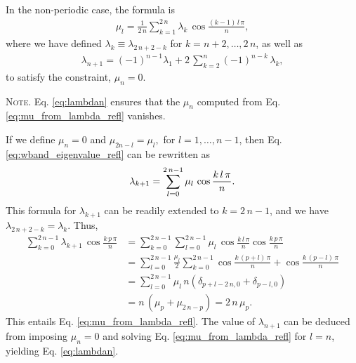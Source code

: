 \documentclass[reprint, superscriptaddress, floatfix]{revtex4-1}
\newcommand{\note}[1]{{\color{DarkGreen}\footnotesize \textsc{Note.} #1}}
\begin{document}
In the non-periodic case,
the formula is
%
\begin{align}
  \mu_l
  =
  \frac 1 { 2 \, n }
  \sum_{ k = 1 }^{ 2 \, n }
    \lambda_{ k } \,
    \cos \frac{ (k - 1) \, l \, \pi }
              {            n        }
  ,
\label{eq:mu_from_lambda_refl}
\end{align}
%
where
we have defined
$\lambda_k \equiv \lambda_{2 \, n + 2 - k}$
for $k = n + 2, \dots, 2 \, n$,
as well as
%
\begin{align}
  \lambda_{ n + 1 }
  =
  (-1)^{ n - 1 }
  \lambda_1
  +
  2 \, \sum_{ k = 2 }^{ n }
      (-1)^{n - k} \, \lambda_k
  ,
\label{eq:lambdan}
\end{align}
to satisfy the constraint, $\mu_n = 0$.
%
\note{Eq. \eqref{eq:lambdan}
  ensures that the $\mu_n$
  computed from Eq. \eqref{eq:mu_from_lambda_refl}
  vanishes.

  If we define $\mu_n = 0$ and
  $
    \mu_{ 2 n - l } = \mu_l,
  $
  for
  $l = 1, \dots, n - 1$,
  then Eq. \eqref{eq:wband_eigenvalue_refl} can be rewritten as
  \begin{align}
    \lambda_{k+1}
    =
    \sum_{ l = 0 }^{ 2 \, n - 1 }
    \mu_l \, \cos \frac{ k \, l \, \pi } { n }.
  \notag
  \end{align}
  This formula for $\lambda_{k+1}$
  can be readily extended to $k = 2 \, n - 1$,
  and we have
  $
    \lambda_{ 2 \, n + 2 - k } = \lambda_k
    .
  $
  Thus,
  $$
  \begin{aligned}
    \sum_{ k = 0 }^{ 2 \, n - 1 }
      \lambda_{ k + 1 } \,
      \cos \frac{ k \, p \, \pi }
                {      n        }
    &=
    \sum_{ k = 0 }^{ 2 \, n - 1 }
      \sum_{ l = 0 }^{ 2 \, n - 1 }
        \mu_l \,
        \cos \frac{ k \, l \, \pi }
                  {      n        }
        \cos \frac{ k \, p \, \pi }
                  {      n        }
    \\
    &=
    \sum_{ l = 0 }^{ 2 \, n - 1 }
      \frac{ \mu_l } { 2 }
      \sum_{ k = 0 }^{ 2 \, n - 1 }
        \cos \frac{ k \, (p + l) \, \pi }
                  {      n        }
                  +
        \cos \frac{ k \, (p - l) \, \pi }
                  {      n        }
    \\
    &=
    \sum_{ l = 0 }^{ 2 \, n - 1 }
      \mu_l \, n \left(
        \delta_{ p + l - 2 \, n, 0 }
        +
        \delta_{ p - l, 0 }
      \right)
    \\
    &=
    n \, \left( \mu_p + \mu_{ 2 \, n - p} \right)
    =
    2 \, n \, \mu_p.
  \end{aligned}
  $$
  This entails Eq. \eqref{eq:mu_from_lambda_refl}.
  The value of $\lambda_{n + 1}$
  can be deduced from
  imposing $\mu_n = 0$
  and solving Eq. \eqref{eq:mu_from_lambda_refl}
  for $l = n$,
  yielding Eq. \eqref{eq:lambdan}.
}
\end{document}
